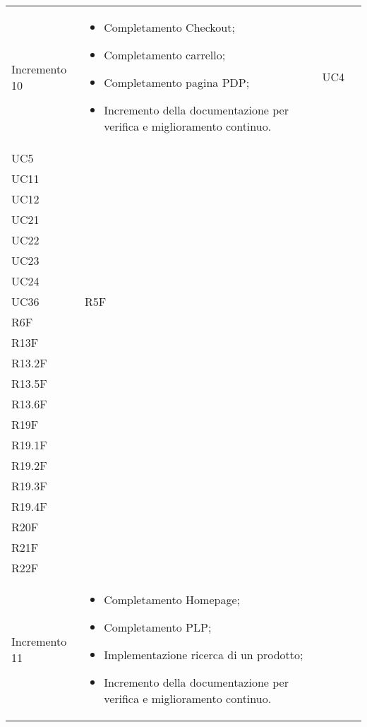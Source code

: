 \begin{longtable}{
    >{\centering}p{}
    >{\raggedright}p{}
    >{\centering}p{}
    >{\centering}p{}
    }
    Incremento 10                 & \vspace{-15px}
    \begin{itemize}
        \renewcommand\labelitemi{-}
        \item Completamento Checkout;
        \item Completamento carrello;
        \item Completamento pagina PDP;
        \item Incremento della documentazione per verifica e miglioramento continuo.
    \end{itemize}    & UC4                                                                                            \\ UC5 \\ UC11                                                                                                                                                                                     \\ UC12 \\ UC21 \\ UC22 \\ UC23 \\ UC24 \\ UC36 & R5F \\ R6F \\ R13F  \\ R13.2F \\ R13.5F \\ R13.6F \\ R19F \\ R19.1F \\ R19.2F \\ R19.3F \\ R19.4F \\ R20F \\ R21F \\ R22F
    \tabularnewline
    Incremento 11                 & \vspace{-15px}
    \begin{itemize}
        \renewcommand\labelitemi{-}
        \item Completamento Homepage;
        \item Completamento PLP;
        \item Implementazione ricerca di un prodotto;
        \item Incremento della documentazione per verifica e miglioramento continuo.

\end{itemize}
\end{longtable}
